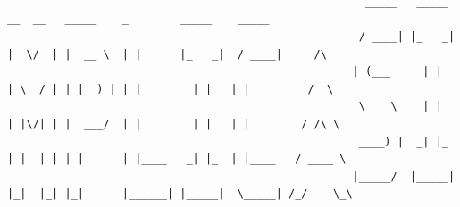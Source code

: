 \documentclass[openany]{book}  %
\begin{document}
\begin{titlepage}
\begin{center}
{\begin{verbatim}
                                                                                                                                                 
                                                                                                                                                 
                                                                                                                                                 
                                                                                                                                                 
                                                                                                                                                 
                                                                                                                                                                                                                                                                                      
                                                                                                                                                                                                                                                                            
                                                                                                                                                                                                                                                                            
                                                        _____   _____   __  __   _____    _        _____    _____            
                                                       / ____| |_   _| |  \/  | |  __ \  | |      |_   _|  / ____|     /\    
                                                      | (___     | |   | \  / | | |__) | | |        | |   | |         /  \   
                                                       \___ \    | |   | |\/| | |  ___/  | |        | |   | |        / /\ \  
                                                       ____) |  _| |_  | |  | | | |      | |____   _| |_  | |____   / ____ \ 
                                                      |_____/  |_____| |_|  |_| |_|      |______| |_____|  \_____| /_/    \_\
                                                                                            
                                                                                                                                                                                                              
                                                                                                                                                              

\end{verbatim}}
\end{center}
\end{titlepage}
\end{document}
